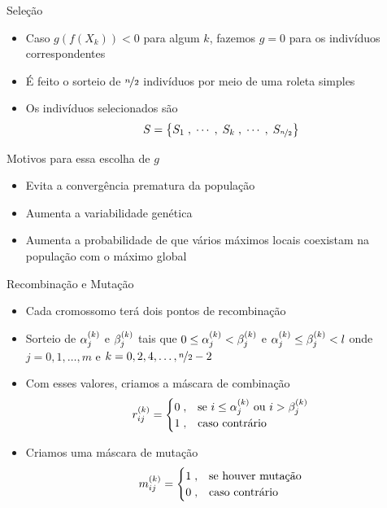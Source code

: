 \begin{frame}{Seleção}
  \begin{itemize}
    \item Caso $g(f(X_k)) < 0$ para algum $k$, fazemos $g = 0$
          para os indivíduos correspondentes
    \item É feito o sorteio de $\nicefrac{n}{2}$ indivíduos por meio de
          uma roleta simples
    \item Os indivíduos selecionados são
          $$ S = \left\{ S_1\;, \;\cdots\;,  \;S_k\;, \;\cdots\;, \;S_{\nicefrac{n}{2}} \right\} $$
  \end{itemize}
  \vfill
  \begin{block}{Motivos para essa escolha de $g$}
    \begin{itemize}
      \item Evita a convergência prematura da população
      \item Aumenta a variabilidade genética
      \item Aumenta a probabilidade de que vários máximos locais coexistam
            na população com o máximo global
    \end{itemize}
  \end{block}
\end{frame}

\begin{frame}{Recombinação e Mutação}
  \begin{itemize}
    \item Cada cromossomo terá dois pontos de recombinação
    \item Sorteio de $ {\alpha}^{(k)}_{j} $ e $ {\beta}^{(k)}_{j} $ tais que
          $ 0 \leq {\alpha}^{(k)}_{j} < {\beta}^{(k)}_{j} $ e $ {\alpha}^{(k)}_{j} \leq {\beta}^{(k)}_{j} < l $ onde
          $ j = 0, 1, \dots, m $ e $ k = 0, 2, 4, \dots, \nicefrac{n}{2} - 2 $
    \item Com esses valores, criamos a máscara de combinação
          $$
            {r}^{(k)}_{ij} =
            \begin{cases}
              0 \;, & \text{se } i \leq {\alpha}^{(k)}_{j} \text{ ou } i > {\beta}^{(k)}_{j} \\
              1 \;, & \text{caso contrário}
            \end{cases}
          $$
    \item Criamos uma máscara de mutação
          $$
            {m}^{(k)}_{ij} =
            \begin{cases}
              1 \;, & \text{se houver mutação} \\
              0 \;, & \text{caso contrário}
            \end{cases}
          $$
  \end{itemize}
\end{frame}


